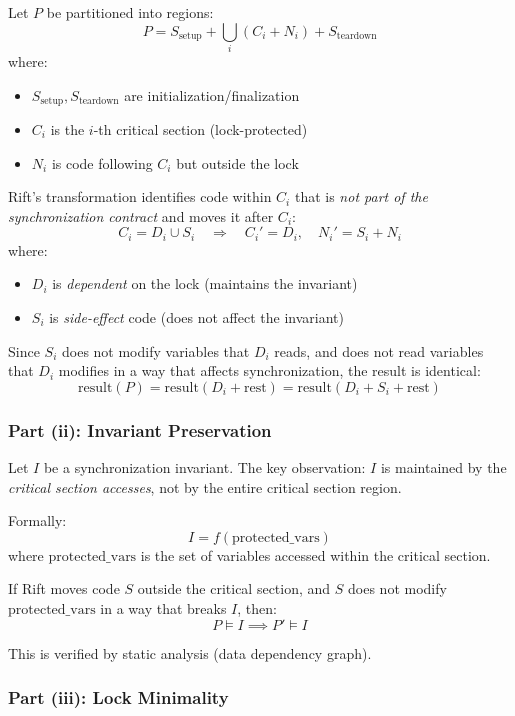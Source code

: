 \documentclass[11pt]{article}
\begin{document}
Let $P$ be partitioned into regions:
\[
P = S_{\text{setup}} + \bigcup_i (C_i + N_i) + S_{\text{teardown}}
\]
where:
\begin{itemize}
    \item $S_{\text{setup}}, S_{\text{teardown}}$ are initialization/finalization
    \item $C_i$ is the $i$-th critical section (lock-protected)
    \item $N_i$ is code following $C_i$ but outside the lock
\end{itemize}

Rift's transformation identifies code within $C_i$ that is \textit{not part of the synchronization contract} and moves it after $C_i$:
\[
C_i = D_i \cup S_i \quad \Rightarrow \quad C_i' = D_i, \quad N_i' = S_i + N_i
\]
where:
\begin{itemize}
    \item $D_i$ is \textit{dependent} on the lock (maintains the invariant)
    \item $S_i$ is \textit{side-effect} code (does not affect the invariant)
\end{itemize}

Since $S_i$ does not modify variables that $D_i$ reads, and does not read variables that $D_i$ modifies in a way that affects synchronization, the result is identical:
\[
\text{result}(P) = \text{result}(D_i + \text{rest}) = \text{result}(D_i + S_i + \text{rest})
\]

\subsubsection{Part (ii): Invariant Preservation}

Let $I$ be a synchronization invariant. The key observation: $I$ is maintained by the \textit{critical section accesses}, not by the entire critical section region.

Formally:
\[
I = f(\text{protected\_vars})
\]
where $\text{protected\_vars}$ is the set of variables accessed within the critical section.

If Rift moves code $S$ outside the critical section, and $S$ does not modify $\text{protected\_vars}$ in a way that breaks $I$, then:
\[
P \models I \implies P' \models I
\]

This is verified by static analysis (data dependency graph).

\subsubsection{Part (iii): Lock Minimality}
\end{document}
